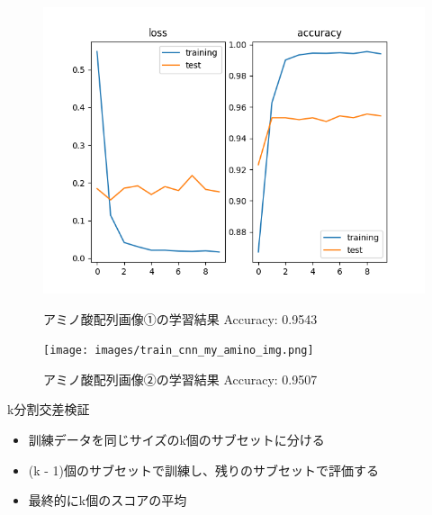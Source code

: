 \documentclass[dvipdfmx]{beamer}
\begin{document}
  \begin{frame}
    \begin{figure}[htbp]
      \begin{minipage}[b]{0.45\linewidth}
        \centering
        \includegraphics[keepaspectratio, scale=0.3]{images/train_cnn_amino_img.png}
        \caption{\newline アミノ酸配列画像①の学習結果 \newline Accuracy: 0.9543}
      \end{minipage}
      \begin{minipage}[b]{0.45\linewidth}
        \centering
        \texttt{[image: images/train\_cnn\_my\_amino\_img.png]}
        \caption{\newline アミノ酸配列画像②の学習結果 \newline Accuracy: 0.9507}
      \end{minipage}
    \end{figure}
  \end{frame}

  \begin{frame}{k分割交差検証}
    \begin{itemize}
        \item 訓練データを同じサイズのk個のサブセットに分ける
        \item (k - 1)個のサブセットで訓練し、残りのサブセットで評価する
        \item 最終的にk個のスコアの平均
    \end{itemize}
  \end{frame}
\end{document}
